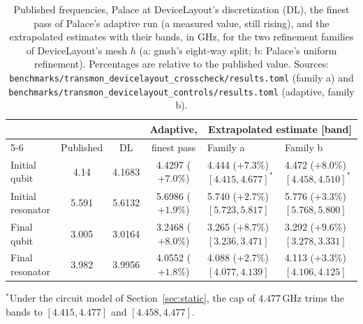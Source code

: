 \documentclass{anvil-paper}
\begin{document}
\begin{table}[htbp]
  \centering
  \caption{Published frequencies, Palace at DeviceLayout's discretization
  (DL), the finest pass of Palace's adaptive run (a measured value, still
  rising), and the extrapolated estimates with their bands, in GHz, for
  the two refinement families of DeviceLayout's mesh $h$ (a: gmsh's
  eight-way split; b: Palace's uniform refinement). Percentages are
  relative to the published value. Sources:
  \texttt{benchmarks/transmon\_devicelayout\_crosscheck/results.toml}
  (family a) and \texttt{benchmarks/transmon\_devicelayout\_controls/results.toml}
  (adaptive, family b).}
  \label{tab:crosscheck}
  \footnotesize
  \setlength{\tabcolsep}{3pt}
  \begin{tabular}{@{}lccc@{\hspace{6pt}}ll@{}}
    \toprule
    & & & Adaptive, & \multicolumn{2}{c}{Extrapolated estimate [band]} \\
    \cmidrule(l){5-6}
    & Published & DL & finest pass & Family a & Family b \\
    \midrule
    Initial qubit & 4.14 & 4.1683 & 4.4297 ($+7.0\%$) & 4.444 ($+7.3\%$) $[4.415, 4.677]^{\ast}$ & 4.472 ($+8.0\%$) $[4.458, 4.510]^{\ast}$ \\
    Initial resonator & 5.591 & 5.6132 & 5.6986 ($+1.9\%$) & 5.740 ($+2.7\%$) $[5.723, 5.817]$ & 5.776 ($+3.3\%$) $[5.768, 5.800]$ \\
    Final qubit & 3.005 & 3.0164 & 3.2468 ($+8.0\%$) & 3.265 ($+8.7\%$) $[3.236, 3.471]$ & 3.292 ($+9.6\%$) $[3.278, 3.331]$ \\
    Final resonator & 3.982 & 3.9956 & 4.0552 ($+1.8\%$) & 4.088 ($+2.7\%$) $[4.077, 4.139]$ & 4.113 ($+3.3\%$) $[4.106, 4.125]$ \\
    \bottomrule
  \end{tabular}

  \smallskip
  {\footnotesize $^{\ast}$Under the circuit model of
  Section~\ref{sec:static}, the cap of $4.477$\,GHz trims the bands to
  $[4.415, 4.477]$ and $[4.458, 4.477]$.}
\end{table}
\end{document}
